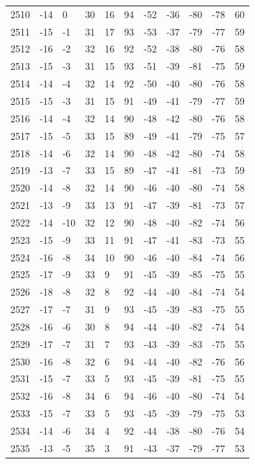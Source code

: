 \begin{table}[H]
\begin{tabular}{lllllllllll}
2510 & -14 & 0 & 30 & 16 & 94 & -52 & -36 & -80 & -78 & 60 \\
2511 & -15 & -1 & 31 & 17 & 93 & -53 & -37 & -79 & -77 & 59 \\
2512 & -16 & -2 & 32 & 16 & 92 & -52 & -38 & -80 & -76 & 58 \\
2513 & -15 & -3 & 31 & 15 & 93 & -51 & -39 & -81 & -75 & 59 \\
2514 & -14 & -4 & 32 & 14 & 92 & -50 & -40 & -80 & -76 & 58 \\
2515 & -15 & -3 & 31 & 15 & 91 & -49 & -41 & -79 & -77 & 59 \\
2516 & -14 & -4 & 32 & 14 & 90 & -48 & -42 & -80 & -76 & 58 \\
2517 & -15 & -5 & 33 & 15 & 89 & -49 & -41 & -79 & -75 & 57 \\
2518 & -14 & -6 & 32 & 14 & 90 & -48 & -42 & -80 & -74 & 58 \\
2519 & -13 & -7 & 33 & 15 & 89 & -47 & -41 & -81 & -73 & 59 \\
2520 & -14 & -8 & 32 & 14 & 90 & -46 & -40 & -80 & -74 & 58 \\
2521 & -13 & -9 & 33 & 13 & 91 & -47 & -39 & -81 & -73 & 57 \\
2522 & -14 & -10 & 32 & 12 & 90 & -48 & -40 & -82 & -74 & 56 \\
2523 & -15 & -9 & 33 & 11 & 91 & -47 & -41 & -83 & -73 & 55 \\
2524 & -16 & -8 & 34 & 10 & 90 & -46 & -40 & -84 & -74 & 56 \\
2525 & -17 & -9 & 33 & 9 & 91 & -45 & -39 & -85 & -75 & 55 \\
2526 & -18 & -8 & 32 & 8 & 92 & -44 & -40 & -84 & -74 & 54 \\
2527 & -17 & -7 & 31 & 9 & 93 & -45 & -39 & -83 & -75 & 55 \\
2528 & -16 & -6 & 30 & 8 & 94 & -44 & -40 & -82 & -74 & 54 \\
2529 & -17 & -7 & 31 & 7 & 93 & -43 & -39 & -83 & -75 & 55 \\
2530 & -16 & -8 & 32 & 6 & 94 & -44 & -40 & -82 & -76 & 56 \\
2531 & -15 & -7 & 33 & 5 & 93 & -45 & -39 & -81 & -75 & 55 \\
2532 & -16 & -8 & 34 & 6 & 94 & -46 & -40 & -80 & -74 & 54 \\
2533 & -15 & -7 & 33 & 5 & 93 & -45 & -39 & -79 & -75 & 53 \\
2534 & -14 & -6 & 34 & 4 & 92 & -44 & -38 & -80 & -76 & 54 \\
2535 & -13 & -5 & 35 & 3 & 91 & -43 & -37 & -79 & -77 & 53 \\

\end{tabular}
\end{table}
